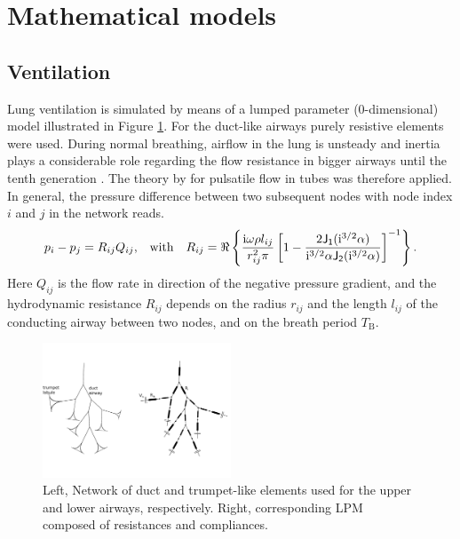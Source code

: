 \section{Mathematical models} \label{sec:mathematial_model}


\subsection{Ventilation} \label{ssec:ducts}
Lung ventilation is simulated by means of a lumped parameter (0-dimensional) model illustrated in Figure \ref{fig:lumpedparametermodel}.
For the duct-like airways purely resistive elements were used.
During normal breathing, airflow in the lung is unsteady and inertia plays a considerable role regarding the flow resistance in bigger airways until the tenth generation \citep{Kaczka2011}.
The theory by \citet{Womersley1957} for pulsatile flow in tubes was therefore applied.
In general, the pressure difference between two subsequent nodes with node index $i$ and $j$ in the network reads.
\begin{equation} \label{eqn:pulsatile_flow_resistance}
p_i - p_j = R_{ij} Q_{ij}\text{,} \quad{\mathrm{with}}\quad R_{ij} = \Re\left\{\frac{\mathrm{i} \omega \rho l_{ij}}{r_{ij}^2 \pi}\left[1-\frac{2\mathsf{J_1}(\mathrm{i}^{3/2}\alpha)}{\mathrm{i}^{3/2}\alpha \mathsf{J_2}(\mathrm{i}^{3/2}\alpha)}\right]^{-1}\right\} \text{.}
\end{equation}
Here $Q_{ij}$ is the flow rate in direction of the negative pressure gradient, and the hydrodynamic resistance $R_{ij}$ depends on the radius $r_{ij}$ and the length $l_{ij}$ of the conducting airway between two nodes, and on the breath period $T_\mathrm{B}$.

\begin{figure}[tb]
\centering
\includegraphics[width=0.5\textwidth]{figures/lumpedparametermodel}
\caption{Left, Network of duct and trumpet-like elements used for the upper and lower airways, respectively. Right, corresponding LPM composed of resistances and compliances.}
\label{fig:lumpedparametermodel}
\end{figure}


